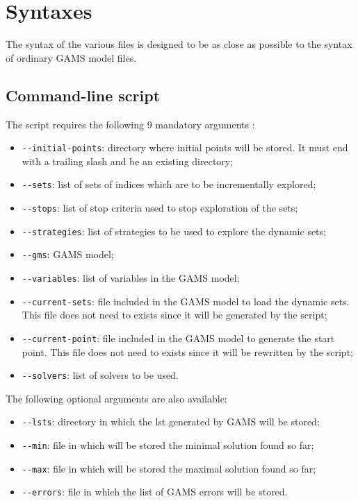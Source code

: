 \section*{Syntaxes}

The syntax of the various files is designed to be as close as possible to the
syntax of ordinary GAMS model files.

\subsection*{Command-line script}

The script requires the following 9 mandatory arguments :
\begin{itemize}
\item \texttt{-{}-initial-points}: directory where initial points will be
  stored. It must end with a trailing slash and be an existing directory;
\item \texttt{-{}-sets}: list of sets of indices which are to be
  incrementally explored;
\item \texttt{-{}-stops}: list of stop criteria used to stop exploration of
  the sets;
\item \texttt{-{}-strategies}: list of strategies to be used to explore the dynamic
  sets;
\item \texttt{-{}-gms}: GAMS model;
\item \texttt{-{}-variables}: list of variables in the GAMS model;
\item \texttt{-{}-current-sets}: file included in the GAMS model to load the
  dynamic sets. This file does not need to exists since it will be generated by
  the script;
\item \texttt{-{}-current-point}: file included in the GAMS model to generate the
  start point. This file does not need to exists since it will be rewritten by
  the script;
\item \texttt{-{}-solvers}: list of solvers to be used.
\end{itemize}

The following optional arguments are also available:
\begin{itemize}
\item \texttt{-{}-lsts}: directory in which the lst generated by GAMS will be
  stored;
\item \texttt{-{}-min}: file in which will be stored the minimal solution found so
  far;
\item \texttt{-{}-max}: file in which will be stored the maximal solution found so
  far;
\item \texttt{-{}-errors}: file in which the list of GAMS errors will be stored.
\end{itemize}

